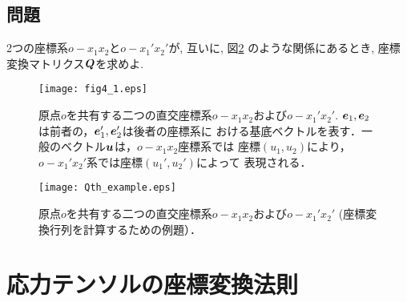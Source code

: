 \documentclass[10pt,a4j]{jbook}
\begin{document}
\subsection{問題}
2つの座標系$o-x_1x_2$と$o-x_1'x_2'$が, 互いに, 図\ref{fig:Qth_example}
のような関係にあるとき, 座標変換マトリクス$\mbox{\boldmath $Q$}$を求めよ. 
\begin{figure}[h]
	\begin{center}
	\texttt{[image: fig4\_1.eps]} 
	\end{center}
	\caption{原点$o$を共有する二つの直交座標系$o-x_1x_2$および$o-x_1'x_2'$. 
	$\mbox{\boldmath $e$}_1, \mbox{\boldmath $e$}_2$は前者の，$\mbox{\boldmath $e$}_1', \mbox{\boldmath $e$}_2'$は後者の座標系に
	おける基底ベクトルを表す．一般のベクトル$\mbox{\boldmath $u$}$は，$o-x_1x_2$座標系では
	座標$(u_1, u_2)$により，$o-x_1'x_2'$系では座標$(u_1', u_2')$によって
	表現される．}
	\label{fig:fig4_3}
\end{figure}
\begin{figure}[h]
	\begin{center}
	\texttt{[image: Qth\_example.eps]} 
	\end{center}
	\caption{原点$o$を共有する二つの直交座標系$o-x_1x_2$および$o-x_1'x_2'$ 
	(座標変換行列を計算するための例題）．}
	\label{fig:Qth_example}
\end{figure}
\section{応力テンソルの座標変換法則}
\end{document}
